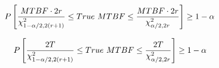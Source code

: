 \documentclass[12pt]{article}
\begin{document}
\pagestyle{empty}
\Large
{}
\pagecolor{ehandbook}

\boldmath
\begin{eqnarray*}
\hspace*{-.5in}
P \left[
\frac{MTBF \cdot 2r}{\chi^2_{1-\alpha/2,2(r+1)}} \le True \,\, MTBF \le \frac{MTBF \cdot 2r}{\chi^2_{\alpha/2, 2r}} \right] \ge 1- \alpha
\end{eqnarray*}

\vspace*{.25in}

\begin{eqnarray*}
\hspace*{-.5in}
P \left[
\frac{2T}{\chi^2_{1-\alpha/2,2(r+1)}} \le True \,\, MTBF \le \frac{2T}{\chi^2_{\alpha/2, 2r}} \right] \ge 1- \alpha
\end{eqnarray*}
\end{document}
